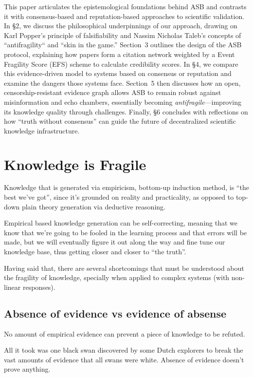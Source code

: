 \documentclass{article}
\begin{document}
This paper articulates the epistemological foundations behind ASB and contrasts it with consensus-based and reputation-based approaches to scientific validation. In \S2, we discuss the philosophical underpinnings of our approach, drawing on Karl Popper's principle of falsifiability and Nassim Nicholas Taleb's concepts of ``antifragility`` and ``skin in the game.'' Section~3 outlines the design of the ASB protocol, explaining how papers form a citation network weighted by a Event Fragility Score (EFS) scheme to calculate credibility scores. In \S4, we compare this evidence-driven model to systems based on consensus or reputation and examine the dangers those systems face. Section~5 then discusses how an open, censorship-resistant evidence graph allows ASB to remain robust against misinformation and echo chambers, essentially becoming \emph{antifragile}---improving its knowledge quality through challenges. Finally, \S6 concludes with reflections on how ``truth without consensus'' can guide the future of decentralized scientific knowledge infrastructure.

\section{Knowledge is Fragile}

Knowledge that is generated via empiricism, bottom-up induction method, is ``the best we've got'', since it's grounded on reality and practicality, as opposed to top-down plain theory generation via deductive reasoning.

Empirical based knowledge generation can be self-correcting, meaning that we know that we're going to be fooled in the learning process and that errors will be made, but we will eventually figure it out along the way and fine tune our knowledge base, thus getting closer and closer to ``the truth''.

Having said that, there are several shortcomings that must be understood about the fragility of knowledge, specially when applied to complex systems (with non-linear responses).

\subsection{Absence of evidence vs evidence of absense}

No amount of empirical evidence can prevent a piece of knowledge to be refuted.

All it took was one black swan discovered by some Dutch explorers to break the vast amounts of evidence that all swans were white. Absence of evidence doesn't prove anything.
\end{document}
